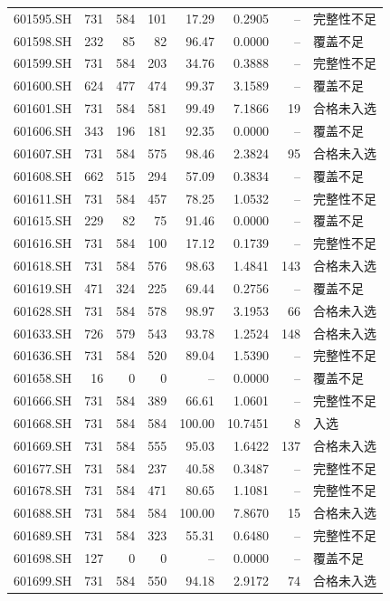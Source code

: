 \documentclass[10pt,a4paper]{article}
\begin{document}
\begin{longtable}{lrrr r r r l}
601595.SH & 731 & 584 & 101 & 17.29 & 0.2905 & -- & 完整性不足\\
601598.SH & 232 & 85 & 82 & 96.47 & 0.0000 & -- & 覆盖不足\\
601599.SH & 731 & 584 & 203 & 34.76 & 0.3888 & -- & 完整性不足\\
601600.SH & 624 & 477 & 474 & 99.37 & 3.1589 & -- & 覆盖不足\\
601601.SH & 731 & 584 & 581 & 99.49 & 7.1866 & 19 & 合格未入选\\
601606.SH & 343 & 196 & 181 & 92.35 & 0.0000 & -- & 覆盖不足\\
601607.SH & 731 & 584 & 575 & 98.46 & 2.3824 & 95 & 合格未入选\\
601608.SH & 662 & 515 & 294 & 57.09 & 0.3834 & -- & 覆盖不足\\
601611.SH & 731 & 584 & 457 & 78.25 & 1.0532 & -- & 完整性不足\\
601615.SH & 229 & 82 & 75 & 91.46 & 0.0000 & -- & 覆盖不足\\
601616.SH & 731 & 584 & 100 & 17.12 & 0.1739 & -- & 完整性不足\\
601618.SH & 731 & 584 & 576 & 98.63 & 1.4841 & 143 & 合格未入选\\
601619.SH & 471 & 324 & 225 & 69.44 & 0.2756 & -- & 覆盖不足\\
601628.SH & 731 & 584 & 578 & 98.97 & 3.1953 & 66 & 合格未入选\\
601633.SH & 726 & 579 & 543 & 93.78 & 1.2524 & 148 & 合格未入选\\
601636.SH & 731 & 584 & 520 & 89.04 & 1.5390 & -- & 完整性不足\\
601658.SH & 16 & 0 & 0 & -- & 0.0000 & -- & 覆盖不足\\
601666.SH & 731 & 584 & 389 & 66.61 & 1.0601 & -- & 完整性不足\\
601668.SH & 731 & 584 & 584 & 100.00 & 10.7451 & 8 & 入选\\
601669.SH & 731 & 584 & 555 & 95.03 & 1.6422 & 137 & 合格未入选\\
601677.SH & 731 & 584 & 237 & 40.58 & 0.3487 & -- & 完整性不足\\
601678.SH & 731 & 584 & 471 & 80.65 & 1.1081 & -- & 完整性不足\\
601688.SH & 731 & 584 & 584 & 100.00 & 7.8670 & 15 & 合格未入选\\
601689.SH & 731 & 584 & 323 & 55.31 & 0.6480 & -- & 完整性不足\\
601698.SH & 127 & 0 & 0 & -- & 0.0000 & -- & 覆盖不足\\
601699.SH & 731 & 584 & 550 & 94.18 & 2.9172 & 74 & 合格未入选\\

\end{longtable}
\end{document}
